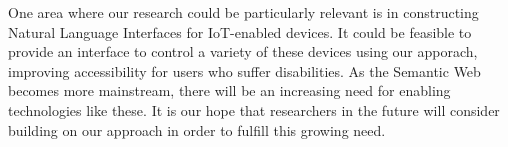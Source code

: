 \documentclass[../main.tex]{subfiles}
\begin{document}
One area where our research could be particularly relevant is in constructing Natural Language Interfaces for IoT-enabled devices.  It could be feasible to provide an interface to control a variety of these devices using our apporach, improving accessibility for users who suffer disabilities.  As the Semantic Web becomes more mainstream, there will be an increasing need for enabling technologies like these.  It is our hope that researchers in the future will consider building on our approach in order to fulfill this growing need.
\end{document}
